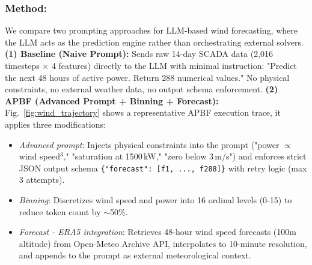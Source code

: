 \documentclass[journal,onecolumn]{IEEEtran} %
\begin{document}
  \subsubsection*{\textbf{Method:}}
  We compare two prompting approaches for LLM-based wind forecasting, where the LLM acts as the prediction engine rather than orchestrating external solvers. \textbf{ (1) Baseline (Naive Prompt):} Sends raw 14-day SCADA data (2,016 timesteps $\times$ 4 features) directly to the LLM with minimal instruction: "Predict the next 48 hours of active power. Return 288 numerical values." No physical constraints, no external weather data, no output schema enforcement. \textbf{ (2) APBF (Advanced Prompt + Binning + Forecast):} Fig.~\ref{fig:wind_trajectory} shows a representative APBF execution trace, it applies three modifications:%
  \begin{itemize}
  \item \textit{Advanced prompt}: Injects physical constraints into the prompt ("power $\propto$ wind speed$^3$," "saturation at 1500\,kW," "zero below 3\,m/s") and enforces  strict JSON output schema \texttt{\{"forecast": [f1, ..., f288]\}} with retry logic (max 3 attempts).
 \item \textit{Binning}: Discretizes wind speed and power into 16 ordinal levels (0-15) to reduce token count by $\sim$50\%.
  \item \textit{Forecast - ERA5 integration}: Retrieves 48-hour wind speed forecasts (100m altitude) from Open-Meteo Archive API, interpolates to 10-minute resolution, and appends to the prompt as external meteorological context.
  \end{itemize}
\end{document}
